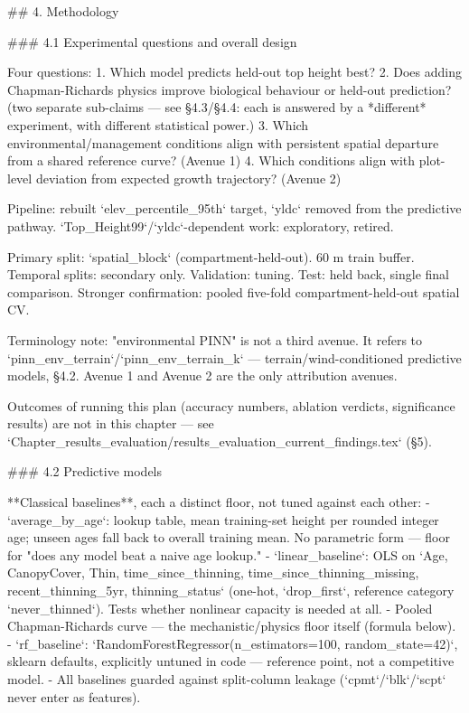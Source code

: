 \documentclass[11pt,a4paper]{report}
\begin{document}
## 4. Methodology

### 4.1 Experimental questions and overall design

Four questions:
1. Which model predicts held-out top height best?
2. Does adding Chapman-Richards physics improve biological behaviour or held-out prediction? (two separate sub-claims — see §4.3/§4.4: each is answered by a *different* experiment, with different statistical power.)
3. Which environmental/management conditions align with persistent spatial departure from a shared reference curve? (Avenue 1)
4. Which conditions align with plot-level deviation from expected growth trajectory? (Avenue 2)

Pipeline: rebuilt `elev_percentile_95th` target, `yldc` removed from the predictive pathway. `Top_Height99`/`yldc`-dependent work: exploratory, retired.

Primary split: `spatial_block` (compartment-held-out). 60 m train buffer. Temporal splits: secondary only.
Validation: tuning. Test: held back, single final comparison. Stronger confirmation: pooled five-fold compartment-held-out spatial CV.

Terminology note: "environmental PINN" is not a third avenue. It refers to `pinn_env_terrain`/`pinn_env_terrain_k` — terrain/wind-conditioned predictive models, §4.2. Avenue 1 and Avenue 2 are the only attribution avenues.

Outcomes of running this plan (accuracy numbers, ablation verdicts, significance results) are not in this chapter — see `Chapter_results_evaluation/results_evaluation_current_findings.tex` (§5).

### 4.2 Predictive models

**Classical baselines**, each a distinct floor, not tuned against each other:
- `average_by_age`: lookup table, mean training-set height per rounded integer age; unseen ages fall back to overall training mean. No parametric form — floor for "does any model beat a naive age lookup."
- `linear_baseline`: OLS on `Age, CanopyCover, Thin, time_since_thinning, time_since_thinning_missing, recent_thinning_5yr, thinning_status` (one-hot, `drop_first`, reference category `never_thinned`). Tests whether nonlinear capacity is needed at all.
- Pooled Chapman-Richards curve — the mechanistic/physics floor itself (formula below).
- `rf_baseline`: `RandomForestRegressor(n_estimators=100, random_state=42)`, sklearn defaults, explicitly untuned in code — reference point, not a competitive model.
- All baselines guarded against split-column leakage (`cpmt`/`blk`/`scpt` never enter as features).
\end{document}
